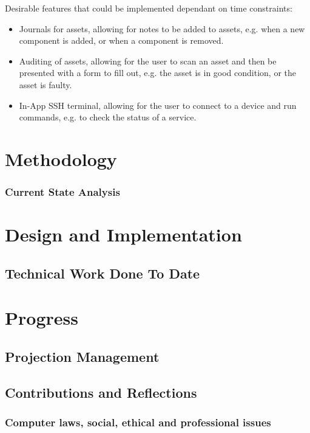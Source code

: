 \documentclass [12pt,letterpaper]{article}
\begin{document}
Desirable features that could be implemented dependant on time constraints:

\begin{itemize}
\item Journals for assets, allowing for notes to be added to assets, e.g. when a new component is added, or when a component is removed.

\item Auditing of assets, allowing for the user to scan an asset and then be presented with a form to fill out, e.g. the asset is in good condition, or the asset is faulty.

\item In-App SSH terminal, allowing for the user to connect to a device and run commands, e.g. to check the status of a service.
\end{itemize}

\section{Methodology}   
\label{sec:methodology}

\subsubsection{Current State Analysis}
\label{sec:current_state_analysis}
\section{Design and Implementation}
\label{sec:design}
\subsection{Technical Work Done To Date}

\section{Progress}
\subsection{Projection Management}
\subsection{Contributions and Reflections}
\subsubsection{Computer laws, social, ethical and professional issues}
\pagebreak

 
\end{document}
